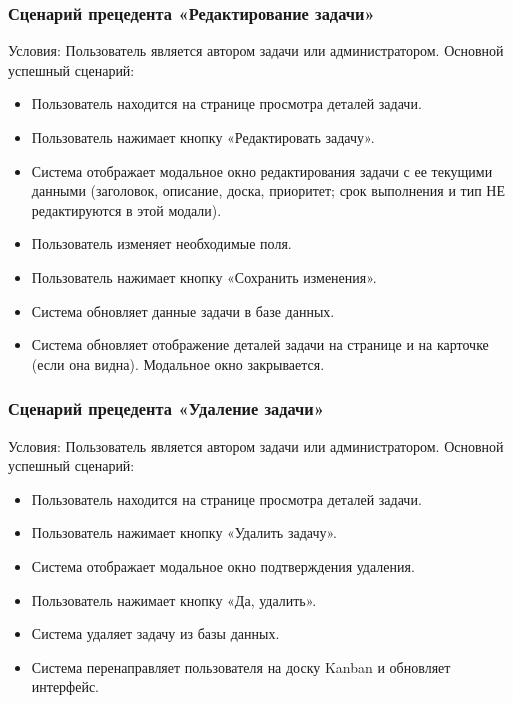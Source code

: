 \subsubsection{Сценарий прецедента «Редактирование задачи»}
Условия: Пользователь является автором задачи или администратором.
Основной успешный сценарий:
\begin{itemize}
	\item Пользователь находится на странице просмотра деталей задачи.
	\item Пользователь нажимает кнопку «Редактировать задачу».
	\item Система отображает модальное окно редактирования задачи с ее текущими данными (заголовок, описание, доска, приоритет; срок выполнения и тип НЕ редактируются в этой модали).
	\item Пользователь изменяет необходимые поля.
	\item Пользователь нажимает кнопку «Сохранить изменения».
	\item Система обновляет данные задачи в базе данных.
	\item Система обновляет отображение деталей задачи на странице и на карточке (если она видна). Модальное окно закрывается.
\end{itemize}

\subsubsection{Сценарий прецедента «Удаление задачи»}
Условия: Пользователь является автором задачи или администратором.
Основной успешный сценарий:
\begin{itemize}
	\item Пользователь находится на странице просмотра деталей задачи.
	\item Пользователь нажимает кнопку «Удалить задачу».
	\item Система отображает модальное окно подтверждения удаления.
	\item Пользователь нажимает кнопку «Да, удалить».
	\item Система удаляет задачу из базы данных.
	\item Система перенаправляет пользователя на доску Kanban и обновляет интерфейс.
\end{itemize}


